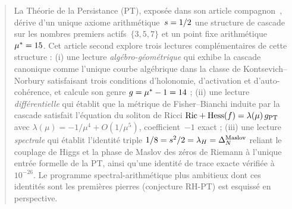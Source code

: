 



\maketitle

\begin{abstract}
\noindent
La Théorie de la Persistance (PT), exposée dans son article compagnon~\cite{PT_Article1_Foundations}, dérive d'un unique axiome arithmétique~$\sper = 1/2$ une structure de cascade sur les nombres premiers actifs~$\{3, 5, 7\}$ et un point fixe arithmétique~$\mustar = 15$. Cet article second explore trois lectures complémentaires de cette structure : (i) une lecture \emph{algébro-géométrique} qui exhibe la cascade canonique comme l'unique courbe algébrique dans la classe de Kontsevich--Norbury satisfaisant trois conditions d'holonomie, d'activation et d'auto-cohérence, et calcule son genre $\genus = \mustar - 1 = 14$ ; (ii) une lecture \emph{différentielle} qui établit que la métrique de Fisher--Bianchi induite par la cascade satisfait l'équation du soliton de Ricci $\Ric + \Hess(f) = \lambda(\mu)\, \gPT$ avec $\lambda(\mu) = -1/\mu^{4} + O(1/\mu^{5})$, coefficient~$-1$ exact ; (iii) une lecture \emph{spectrale} qui établit l'identité triple $1/8 = \sper^{2}/2 = \lambdaH = \DeltaMaslov$ reliant le couplage de Higgs et la phase de Maslov des zéros de Riemann à l'unique entrée formelle de la PT, ainsi qu'une identité de trace exacte vérifiée à $10^{-26}$. Le programme spectral-arithmétique plus ambitieux dont ces identités sont les premières pierres (conjecture RH-PT) est esquissé en perspective.
\end{abstract}

\tableofcontents








\appendix



\printbibliography



